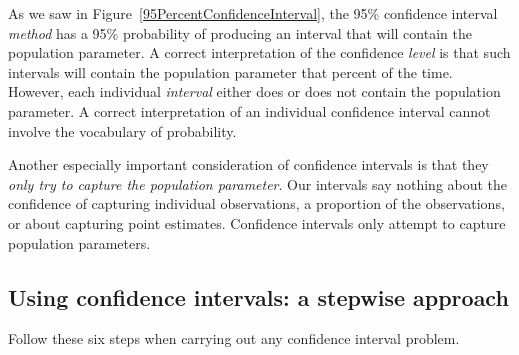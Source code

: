 As we saw in Figure~\ref{95PercentConfidenceInterval}, the 95\% confidence interval \emph{method} has a 95\% probability of producing an interval that will contain the population parameter. A correct interpretation of the confidence \emph{level} is that such intervals will contain the population parameter that percent of the time. However, each individual \emph{interval} either does or does not contain the population parameter. A correct interpretation of an individual confidence interval cannot involve the vocabulary of probability.

Another especially important consideration of confidence intervals is that they \emph{only try to capture the population parameter}. Our intervals say nothing about the confidence of capturing individual observations, a proportion of the observations, or about capturing point estimates. Confidence intervals only attempt to capture population parameters.



\subsection{Using confidence intervals: a stepwise approach}

Follow these six steps when carrying out any confidence interval problem. %


